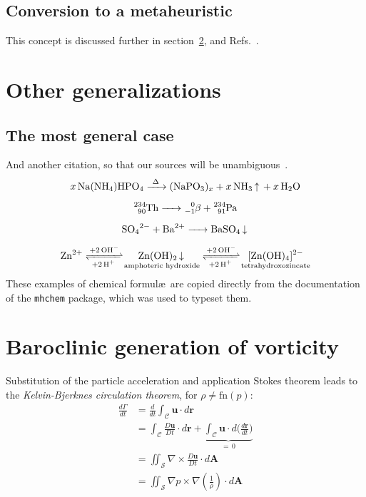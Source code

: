 \subsection{Conversion to a metaheuristic}

\lipsum[11-12] This concept is discussed further in section~\ref{sec:stratified-flow}, and Refs.~\cite{euler1740,fourier1822}.


\section{Other generalizations}

\subsection{The most general case}

\lipsum[7] And another citation, so that our sources will be unambiguous~\cite{montijano2014}.
\begin{gather}
\ce{x Na(NH4)HPO4 ->[\Delta] (NaPO3)_x + x NH3 ^ + x H2O} \\[0.5em]
\ce{^234_90Th -> ^0_-1$\beta${} + ^234_91Pa} \\[0.5em]
\ce{SO4^2- + Ba^2+ -> BaSO4 v} \\[0.5em]
\ce{Zn^2+
<=>[+ 2OH-][+ 2H+]
$\underset{\textrm{amphoteric hydroxide}}{\ce{Zn(OH)2 v}}$
<=>[+ 2OH-][+ 2H+]
$\underset{\textrm{tetrahydroxozincate}}{\ce{[Zn(OH)4]^2-}}$
}
\end{gather}
These examples of chemical formul\ae\ are copied directly from the documentation of the \texttt{mhchem} package, which was used to typeset them.

\section{Baroclinic generation of vorticity}\label{sec:stratified-flow}

Substitution of the particle acceleration and application Stokes theorem leads to the \textit{Kelvin-Bjerknes circulation theorem}, for
$\rho \neq \textrm{fn}(p)$:
\begin{align}
\frac{d\Gamma}{dt} &{}= \frac{d}{dt} \int_{\mathcal{C}} \mathbf{u} \cdot d\mathbf{r}\\
				   &{}= \int_{\mathcal{C}} \frac{D\mathbf{u}}{Dt} \cdot d\mathbf{r} + \underbrace{\int_{\mathcal{C}} \mathbf{u}\cdot d\biggl( \frac{d\mathbf{r}}{dt}\biggr)}_{=\, 0} \\[-2pt]
                   &{}= \iint_{\mathcal{S}} \nabla \times \frac{D\mathbf{u}}{Dt}  \cdot d\mathbf{A}\\
                   &{}= \iint_{\mathcal{S}}  \nabla p \times \nabla \left( \frac{1}{\rho}\right) \cdot d\mathbf{A}
\end{align}

